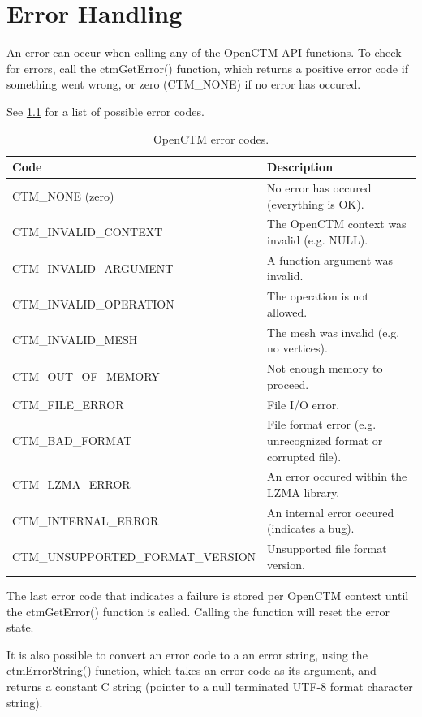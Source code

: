 \chapter{Error Handling}
An error can occur when calling any of the OpenCTM API functions. To check
for errors, call the ctmGetError() function, which returns a positive error
code if something went wrong, or zero (CTM\_NONE) if no error has occured.

See \ref{tab:ErrorCodes} for a list of possible error codes.

\begin{table}[p]
\centering
\begin{tabular}{|l|p{7cm}|}\hline
\textbf{Code} & \textbf{Description}\\ \hline
CTM\_NONE (zero) & No error has occured (everything is OK).\\ \hline
CTM\_INVALID\_CONTEXT & The OpenCTM context was invalid (e.g. NULL).\\ \hline
CTM\_INVALID\_ARGUMENT & A function argument was invalid.\\ \hline
CTM\_INVALID\_OPERATION & The operation is not allowed.\\ \hline
CTM\_INVALID\_MESH & The mesh was invalid (e.g. no vertices).\\ \hline
CTM\_OUT\_OF\_MEMORY & Not enough memory to proceed.\\ \hline
CTM\_FILE\_ERROR & File I/O error.\\ \hline
CTM\_BAD\_FORMAT & File format error (e.g. unrecognized format or corrupted file).\\ \hline
CTM\_LZMA\_ERROR & An error occured within the LZMA library.\\ \hline
CTM\_INTERNAL\_ERROR & An internal error occured (indicates a bug).\\ \hline
CTM\_UNSUPPORTED\_FORMAT\_VERSION & Unsupported file format version.\\ \hline
\end{tabular}
\caption{OpenCTM error codes.}
\label{tab:ErrorCodes}
\end{table}

The last error code that indicates a failure is stored per OpenCTM context
until the ctmGetError() function is called. Calling the function will reset
the error state.

It is also possible to convert an error code to a an error string, using the
ctmErrorString() function, which takes an error code as its argument, and
returns a constant C string (pointer to a null terminated UTF-8 format
character string).



